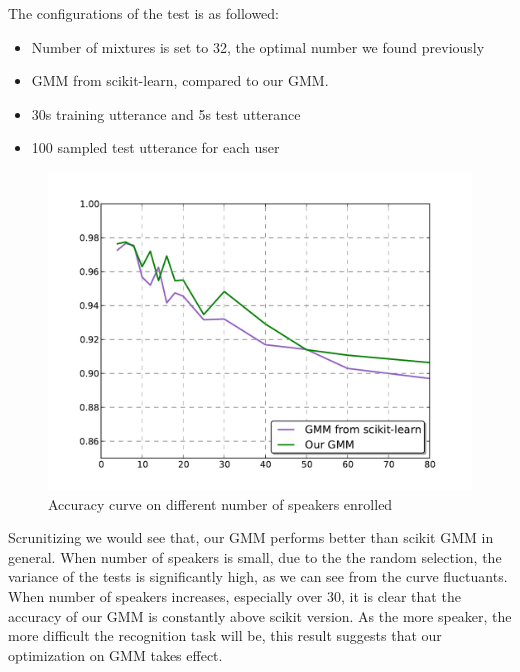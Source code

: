 The configurations of the test is as followed:
\begin{itemize}
	\item Number of mixtures is set to 32, the optimal number we found previously
	\item GMM from scikit-learn, compared to our GMM.
	\item 30s training utterance and 5s test utterance
	\item 100 sampled test utterance for each user
\end{itemize}

\begin{figure}[!ht]
	\label{fig:nspk_enrolled}
	\centering
	\includegraphics[width=\linewidth]{res/nperson.pdf}
	\caption{Accuracy curve on different number of speakers enrolled}
\end{figure}

Scrunitizing  we would see that, our GMM performs better than
scikit GMM in general. When number of speakers is small, due to the the random
selection, the variance of the tests is significantly high, as we can see from the curve fluctuants.
When number of speakers increases, especially over 30, it is clear that the
accuracy of our GMM is constantly above scikit version. As the more speaker,
the more difficult the recognition task will be, this result suggests that our
optimization on GMM takes effect.



